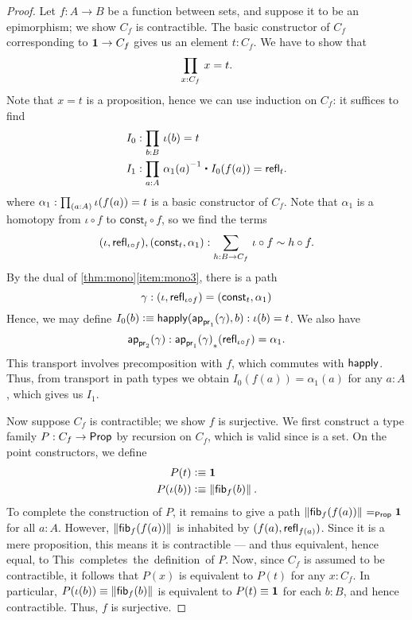 \begin{proof}
Let $f:A\to B$ be a function between sets, and suppose it to be an epimorphism; we show $C_f$ is contractible.
The basic constructor of $C_f$ corresponding to
$\mathbf{1}\to C_f$ gives us an element $t:C_f$. We have to show that
\begin{equation*}
\prd{x:C_f} x= t.
\end{equation*}
Note that $x= t$ is a proposition, hence we can use induction on
$C_f$: it suffices to find
\begin{align*}
I_0 & : \prd{b:B} \iota(b)= t\\
I_1 & : \prd{a:A} \opp{\alpha_1(a)} \ct I_0(f(a))=\refl{t}.
\end{align*}
where $\alpha_1:\prd{a:A} \iota(f(a))= t$ is a basic constructor
of $C_f$. Note that $\alpha_1$ is a homotopy from $\iota\circ f$ to
$\mathsf{const}_t\circ f$, so we find the terms
\begin{equation*}
\pairr{\iota,\refl{\iota\circ f}},\pairr{\mathsf{const}_t,\alpha_1}:
\sm{h:B\to C_f} \iota\circ f\sim h\circ f.
\end{equation*}
By the dual of \autoref{thm:mono}\ref{item:mono3}, there is a path
\begin{equation*}
\gamma:{(\iota,\mathsf{refl}_{\iota\circ f})}={(\mathsf{const}_t,\alpha_1)}
\end{equation*}
Hence, we may define $I_0(b)\vcentcolon\equiv \mathsf{happly}(\mathsf{ap}_{\mathsf{pr}_{1}}(\gamma),b):\iota(b)=t$.
We also have
\[\mathsf{ap}_{\mathsf{pr}_{2}}(\gamma) : {\mathsf{ap}_{\mathsf{pr}_{1}}(\gamma)}_{*}\mathopen{}\left({\mathsf{refl}_{\iota\circ f}}\right)\mathclose{} = \alpha_1. \]
This transport involves precomposition with $f$, which commutes with $\mathsf{happly}$.
Thus, from transport in path types we obtain $I_0(f(a)) = \alpha_1(a)$ for any $a:A$, which gives us $I_1$.

Now suppose $C_f$ is contractible; we show $f$ is surjective.
We first construct a type family $P:C_f\to\mathsf{Prop}$ by recursion on $C_f$, which is valid since \prop is a set.
On the point constructors, we define
\begin{align*}
P(t) & \vcentcolon\equiv \mathbf{1}\\
P(\iota(b)) & \vcentcolon\equiv \left\Vert {\mathsf{fib}}_{f}(b)\right\Vert_{}.
\end{align*}
To complete the construction of $P$, it remains to give a path $\left\Vert {\mathsf{fib}}_{f}(f(a))\right\Vert_{} =_\mathsf{Prop} \mathbf{1}$ for all $a:A$.
However, $\left\Vert {\mathsf{fib}}_{f}(f(a))\right\Vert_{}$ is inhabited by $(f(a),\mathsf{refl}_{f(a)})$.
Since it is a mere proposition, this means it is contractible --- and thus equivalent, hence equal, to \unit.
This completes the definition of $P$.
Now, since $C_f$ is assumed to be contractible, it follows that $P(x)$ is equivalent to $P(t)$ for any $x:C_f$.
In particular, $P(\iota(b))\equiv \left\Vert {\mathsf{fib}}_{f}(b)\right\Vert_{}$ is equivalent to $P(t)\equiv \mathbf{1}$ for each $b:B$, and hence contractible.
Thus, $f$ is surjective.


\end{proof}

